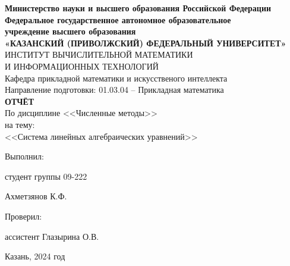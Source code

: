 \documentclass[a4paper,12pt]{article}
\begin{document}
	
	\begin{center}
		\hfill \break
		\textbf{\large{Министерство науки и высшего образования Российской Федерации\\
				Федеральное государственное автономное образовательное\\
				учреждение высшего образования}}
		\\
		\large{\textbf{«КАЗАНСКИЙ (ПРИВОЛЖСКИЙ) ФЕДЕРАЛЬНЫЙ УНИВЕРСИТЕТ»}}\\
		\hfill \break
		\large{ИНСТИТУТ ВЫЧИСЛИТЕЛЬНОЙ МАТЕМАТИКИ\\ И ИНФОРМАЦИОННЫХ ТЕХНОЛОГИЙ}\\
		\hfill \break
		\large{Кафедра прикладной математики и искусственого интеллекта}\\
		\hfill\break
		\hfill \break
		\large{Направление подготовки: 01.03.04 – Прикладная математика}\\
		\hfill \break
		\hfill \break
		\textbf{\large{ОТЧЁТ}}\\
		\large{По дисциплине <<Численные методы>>}\\
		\large{на тему:}\\
		\large{<<Система линейных алгебраических уравнений>>}\\
		\hfill \break
		\hfill \break
	\end{center}
	
	\hfill \break
	\begin{flushright}
		
		\large{Выполнил:}
		
		\large{студент группы 09-222}
		
		\large{Ахметзянов К.Ф.}
		
		\large{Проверил:}
		
		\large{ассистент Глазырина О.В.}
		
	\end{flushright}
	\vfill
	\begin{center} \large{Казань, 2024 год} \end{center}
	\thispagestyle{empty}
	
\end{document}
